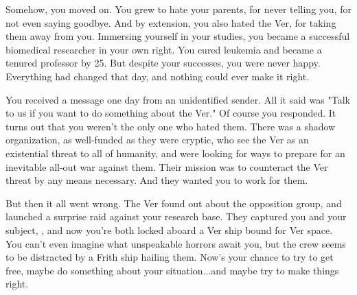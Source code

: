 \documentclass[char]{guildcamp4}
\begin{document}
Somehow, you moved on. You grew to hate your parents, for never telling you, for not even saying goodbye. And by extension, you also hated the Ver, for taking them away from you. Immersing yourself in your studies, you became a successful biomedical researcher in your own right. You cured leukemia and became a tenured professor by 25. But despite your successes, you were never happy. Everything had changed that day, and nothing could ever make it right.

You received a message one day from an unidentified sender. All it said was "Talk to us if you want to do something about the Ver." Of course you responded. It turns out that you weren't the only one who hated them. There was a shadow organization, as well-funded as they were cryptic, who see the Ver as an existential threat to all of humanity, and were looking for ways to prepare for an inevitable all-out war against them. Their mission was to counteract the Ver threat by any means necessary. And they wanted you to work for them.

But then it all went wrong. The Ver found out about the opposition group, and launched a surprise raid against your research base. They captured you and your subject, \cPlead{}, and now you're both locked aboard a Ver ship bound for Ver space. You can't even imagine what unspeakable horrors await you, but the crew seems to be distracted by a Frith ship hailing them. Now's your chance to try to get free, maybe do something about your situation...and maybe try to make things right.
\end{document}
